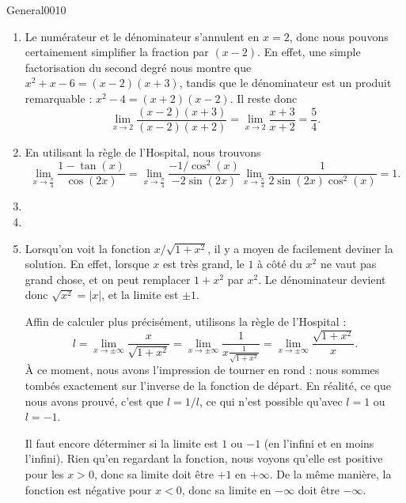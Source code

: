 \begin{corrige}{General0010}

\begin{enumerate}

\item
Le numérateur et le dénominateur s'annulent en $x=2$, donc nous pouvons certainement simplifier la fraction par $(x-2)$. En effet, une simple factorisation du second degré nous montre que $x^2+x-6=(x-2)(x+3)$, tandis que le dénominateur est un produit remarquable : $x^2-4=(x+2)(x-2)$. Il reste donc
\begin{equation}
	\lim_{x\to 2} \frac{ (x-2)(x+3) }{ (x-2)(x+2) }=\lim_{x\to 2} \frac{ x+3 }{ x+2 }=\frac{ 5 }{ 4 }.
\end{equation}

\item
En utilisant la règle de l'Hospital, nous trouvons
\begin{equation}
	\lim_{x\to \frac{ \pi }{ 4 }} \frac{ 1-\tan(x) }{ \cos(2x) }=\lim_{x\to \frac{ \pi }{ 4 }} \frac{ -1/\cos^2(x) }{ -2\sin(2x) }\lim_{x\to \frac{ \pi }{ 4 }} \frac{ 1 }{ 2\sin(2x)\cos^2(x) }=1.
\end{equation}

\item
\item
\item
Lorsqu'on voit la fonction $x/\sqrt{1+x^2}$, il y a moyen de facilement deviner la solution. En effet, lorsque $x$ est très grand, le $1$ à côté du $x^2$ ne vaut pas grand chose, et on peut remplacer $1+x^2$ par $x^2$. Le dénominateur devient donc $\sqrt{x^2}=| x |$, et la limite est $\pm 1$.

Affin de calculer plus précisément, utilisons la règle de l'Hospital :
\begin{equation}
	l=\lim_{x\to \pm\infty} \frac{ x }{ \sqrt{1+x^2} }=\lim_{x\to \pm\infty} \frac{1}{ x\frac{ 1 }{ \sqrt{1+x^2} } }=\lim_{x\to \pm\infty} \frac{ \sqrt{1+x^2} }{ x }.
\end{equation}
À ce moment, nous avons l'impression de tourner en rond : nous sommes tombés exactement sur l'inverse de la fonction de départ. En réalité, ce que nous avons prouvé, c'est que $l=1/l$, ce qui n'est possible qu'avec $l=1$ ou $l=-1$.

Il faut encore déterminer si la limite est $1$ ou $-1$ (en l'infini et en moins l'infini). Rien qu'en regardant la fonction, nous voyons qu'elle est positive pour les $x>0$, donc sa limite doit être $+1$ en $+\infty$. De la même manière, la fonction est négative pour $x<0$, donc sa limite en $-\infty$ doit être $-\infty$.


\end{enumerate}
\end{corrige}
